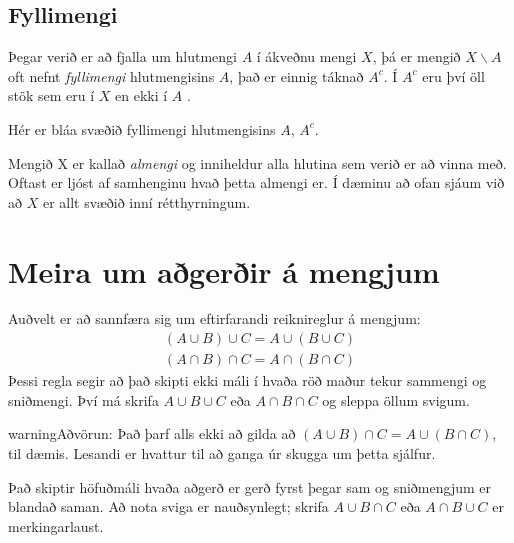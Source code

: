 \documentclass[a4paper,10pt,icelandic]{sphinxmanual}
\begin{document}
\subsection{Fyllimengi}
\label{\detokenize{Kafli04:fyllimengi}}
Þegar verið er að fjalla um hlutmengi \(A\) í ákveðnu mengi \(X\), þá er mengið \(X \backslash A\) oft nefnt \textit{fyllimengi} hlutmengisins \(A\), það er einnig táknað \(A^c\).
Í \(A^c\) eru því öll stök sem eru í \(X\) en ekki í \(A\) .


Hér er bláa svæðið fyllimengi hlutmengisins  \(A\), \(A^c\).

Mengið X er kallað \textit{almengi} og inniheldur alla hlutina sem verið er að vinna með. Oftast er ljóst af samhenginu hvað
þetta almengi er. Í dæminu að ofan sjáum við að \(X\) er allt svæðið inní rétthyrningum.


\section{Meira um aðgerðir á mengjum}
\label{\detokenize{Kafli04:meira-um-agerir-a-mengjum}}
Auðvelt er að sannfæra sig um eftirfarandi reiknireglur á mengjum:
\begin{equation*}
\begin{split}\left(A\cup B\right)\cup C=A\cup\left(B\cup C\right)\end{split}
\end{equation*}\begin{equation*}
\begin{split}\left(A\cap B\right)\cap C=A\cap\left(B\cap C\right)\end{split}
\end{equation*}
Þessi regla segir að það skipti ekki máli í hvaða röð maður tekur sammengi og sniðmengi.
Því má skrifa \(A\cup B\cup C\) eða \(A\cap B\cap C\) og sleppa öllum svigum.

\begin{sphinxadmonition}{warning}{Aðvörun:}
Það þarf alls ekki að gilda að \(\left(A\cup B\right)\cap C=A\cup\left(B\cap C\right)\), til dæmis. Lesandi er hvattur til að ganga úr skugga um þetta sjálfur.

Það skiptir höfuðmáli hvaða aðgerð er gerð fyrst þegar sam\sphinxhyphen{} og sniðmengjum er blandað saman. Að nota sviga er nauðsynlegt;  skrifa \(A\cup B\cap C\) eða \(A\cap B\cup C\) er merkingarlaust.
\end{sphinxadmonition}
\end{document}
